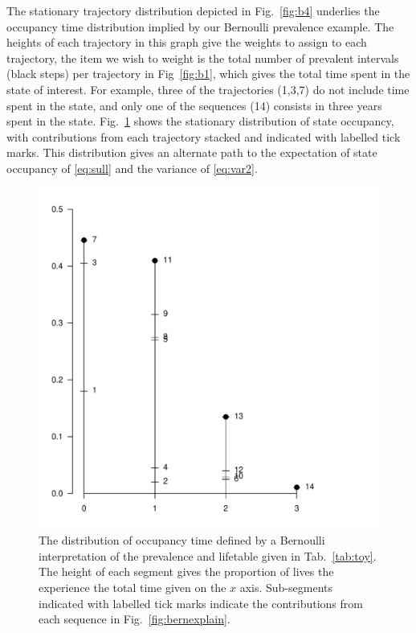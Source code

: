 \documentclass{bmcart}
\begin{document}
The stationary trajectory distribution depicted in Fig.~\ref{fig:b4} underlies the occupancy time distribution implied by our Bernoulli prevalence example. The heights of each trajectory in this graph give the weights to assign to each trajectory, the item we wish to weight is the total number of prevalent intervals (black steps) per trajectory in Fig~\ref{fig:b1}, which gives the total time spent in the state of interest. For example, three of the trajectories (1,3,7) do not include time spent in the state, and only one of the sequences (14) consists in three years spent in the state. Fig.~\ref{fig:DiDist} shows the stationary distribution of state occupancy, with contributions from each trajectory stacked and indicated with labelled tick marks. This distribution gives an alternate path to the expectation of state occupancy of \eqref{eq:sull} and the variance of \eqref{eq:var2}. 
\begin{figure}[ht!]
\centering
\includegraphics[scale=.6]{Figures/DiDist.pdf}
\caption{The distribution of occupancy time defined by a Bernoulli interpretation of the prevalence and lifetable given in Tab.~\ref{tab:toy}. The height of each segment gives the proportion of lives the experience the total time given on the $x$ axis. Sub-segments indicated with labelled tick marks indicate the contributions from each sequence in Fig.~\ref{fig:bernexplain}.}\label{fig:DiDist}
\end{figure}
\FloatBarrier
\end{document}
